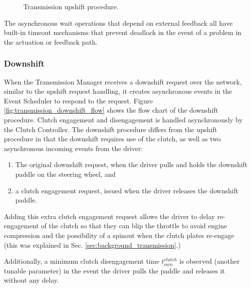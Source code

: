 
\begin{figure}[H]
\centering

\caption{Transmission upshift procedure.}
\label{fig:transmission_upshift_flow}
\end{figure}

The asynchronous wait operations that depend on external feedback all have built-in timeout mechanisms that prevent deadlock in the event of a problem in the actuation or feedback path.

\subsubsection{Downshift}

When the Transmission Manager receives a downshift request over the network, similar to the upshift request handling, it creates asynchronous events in the Event Scheduler to respond to the request. Figure \ref{fig:transmission_downshift_flow} shows the flow chart of the downshift procedure. Clutch engagement and disengagement is handled asynchronously by the Clutch Controller. The downshift procedure differs from the upshift procedure in that the downshift requires use of the clutch, as well as two asynchronous incoming events from the driver:

\begin{enumerate}
  \item The original downshift request, when the driver pulls and holds the downshift paddle on the steering wheel, and
  \item a clutch engagement request, issued when the driver releases the downshift paddle.
\end{enumerate}

Adding this extra clutch engagement request allows the driver to delay re-engagement of the clutch so that they can blip the throttle to avoid engine compression and the possibility of a spinout when the clutch plates re-engage (this was explained in Sec. \ref{sec:background_transmission}.)

Additionally, a minimum clutch disengagement time $t^{clutch}_{min}$ is observed (another tunable parameter) in the event the driver pulls the paddle and releases it without any delay.


